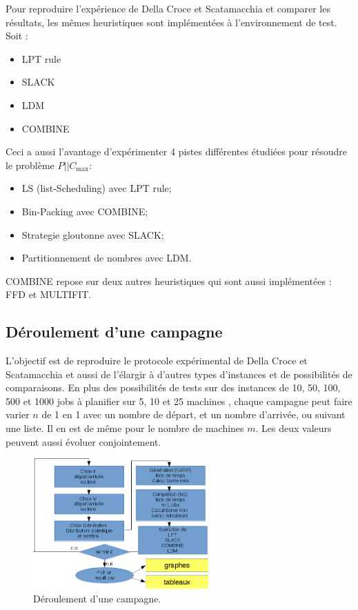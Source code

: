 \documentclass[a4paper,12pt]{report}
\theoremstyle{plain}				%
\theoremstyle{definition}				%
\newcommand\problemGrahamP{$P||C_{\max}$\xspace}
\newcommand\dcs{Della Croce et Scatamacchia\xspace}
\begin{document}
Pour reproduire l'expérience de \dcs et comparer les résultats, les mêmes heuristiques sont implémentées à l'environnement de test. Soit :
\begin{itemize}
	\item LPT rule
	\item SLACK
	\item LDM
	\item COMBINE
\end{itemize}

Ceci a aussi l'avantage d'expérimenter 4 pistes différentes étudiées 
  pour résoudre le problème \problemGrahamP :
\begin{itemize}
	\item LS (list-Scheduling) avec LPT rule; 
	\item Bin-Packing avec COMBINE; 
	\item Strategie gloutonne avec SLACK; 
	\item Partitionnement de nombres avec LDM.  
\end{itemize}

COMBINE repose sur deux autres heuristiques qui sont aussi implémentées : FFD et MULTIFIT.



\subsection{Déroulement d'une campagne} \label{ssec:campagnesDeroullementDUneCampagne}
L'objectif est de reproduire le protocole expérimental de \dcs et aussi de l'élargir 
  à d'autres types d'instances et de possibilités de comparaisons.
En plus des possibilités de tests sur des instances de 10, 50, 100, 500 et 1000 jobs à planifier 
  sur 5, 10 et 25 machines \cite{della2020longest}, 
  chaque campagne peut faire varier $n$ de 1 en 1 avec 
  un nombre de départ, et un nombre d'arrivée, 
  ou suivant une liste. 
Il en est de même pour le nombre de machines $m$. 
Les deux valeurs peuvent aussi évoluer conjointement.

\begin{figure}
{\centering
\includegraphics[height=50mm]{derouleCampagne.png}
\caption{Déroulement d'une campagne.}
\label{fig:deroulementDUneCampagne}
\par}
\end{figure}
\end{document}
